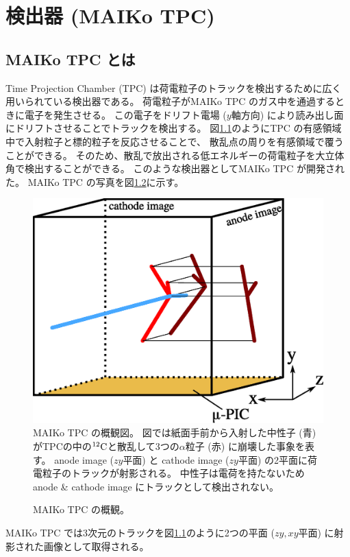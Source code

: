 \chapter{検出器 (MAIKo TPC)}
\section{MAIKo TPC とは}
Time Projection Chamber (TPC) は荷電粒子のトラックを検出するために広く用いられている検出器である。
荷電粒子がMAIKo TPC のガス中を通過するときに電子を発生させる。
この電子をドリフト電場 ($y$軸方向) により読み出し面にドリフトさせることでトラックを検出する。
図\ref{fig::MAIKo_view}のようにTPC の有感領域中で入射粒子と標的粒子を反応させることで、
散乱点の周りを有感領域で覆うことができる。
そのため、散乱で放出される低エネルギーの荷電粒子を大立体角で検出することができる。
このような検出器としてMAIKo TPC が開発された。
MAIKo TPC の写真を図\ref{pic::MAIKo}に示す。
\begin{figure}
  \centering
  \includegraphics[clip, width=0.7\columnwidth]{eps/MAIKo2.eps}
  \caption[MAIKo TPC の概観図。]{MAIKo TPC の概観図。
    図では紙面手前から入射した中性子 (青) がTPCの中の${}^{12}{\rm C}$と散乱して3つの$\alpha$粒子 (赤) に崩壊した事象を表す。
    anode image ($zy$平面) と cathode image ($zy$平面) の2平面に荷電粒子のトラックが射影される。
    中性子は電荷を持たないためanode \& cathode image にトラックとして検出されない。
  }
  \label{fig::MAIKo_view}
\end{figure}
\begin{figure}
  \centering
  \caption[MAIKo TPC の概観。]{MAIKo TPC の概観。}
  \label{pic::MAIKo}
\end{figure}
MAIKo TPC では3次元のトラックを図\ref{fig::MAIKo_view}のように2つの平面 ($zy, xy$平面) に射影された画像として取得される。

